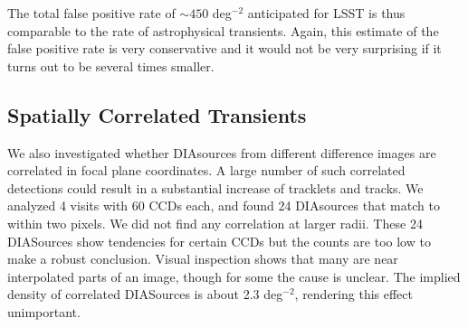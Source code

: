 The total false positive rate of $\sim450$ deg$^{-2}$ anticipated for LSST is thus
comparable to the rate of astrophysical transients. Again, this estimate of the false
positive rate is very conservative and it would not be very surprising if it turns out 
to be several times smaller. 

\subsection{Spatially Correlated Transients} 


We also investigated whether DIAsources from different difference images are correlated 
in focal plane coordinates. A large number of such correlated detections could result in
a substantial increase of tracklets and tracks. We analyzed 4 visits with 60 CCDs each, 
and found 24 DIAsources that match to within two pixels. We did not find any correlation at 
larger radii. These 24 DIASources show tendencies for certain CCDs but the counts are too 
low to make a robust conclusion. Visual inspection shows that many are near interpolated 
parts of an image, though for some the cause is unclear.  The implied density of correlated 
DIASources is about 2.3 deg$^{-2}$, rendering this effect unimportant. 

